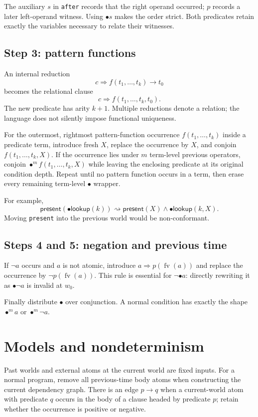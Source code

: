\documentclass[11pt]{article}
\newcommand{\prev}{\mathbin{\bullet}}
\newcommand{\FV}{\operatorname{fv}}
\begin{document}
The auxiliary $s$ in \verb|after| records that the right operand occurred;
$p$ records a later left-operand witness.  Using $\prev s$ makes the order
strict.  Both predicates retain exactly the variables necessary to relate
their witnesses.

\subsection{Step 3: pattern functions}\label{sec:pf}

An internal reduction
\[
c\Rightarrow f(t_1,\ldots,t_k)\to t_0
\]
becomes the relational clause
\[
c\Rightarrow f(t_1,\ldots,t_k,t_0).
\]
The new predicate has arity $k+1$.  Multiple reductions denote a relation;
the language does not silently impose functional uniqueness.

For the outermost, rightmost pattern-function occurrence
$f(t_1,\ldots,t_k)$ inside a predicate term, introduce fresh $X$, replace the
occurrence by $X$, and conjoin $f(t_1,\ldots,t_k,X)$.  If the occurrence lies
under $m$ term-level previous operators, conjoin
$\prev^m f(t_1,\ldots,t_k,X)$ while leaving the enclosing predicate at its
original condition depth.  Repeat until no pattern function occurs in a
term, then erase every remaining term-level $\prev$ wrapper.

For example,
\[
\mathsf{present}(\prev\mathsf{lookup}(k))
\rightsquigarrow
\mathsf{present}(X)\wedge\prev\mathsf{lookup}(k,X).
\]
Moving \verb|present| into the previous world would be non-conformant.

\subsection{Steps 4 and 5: negation and previous time}

If $\neg a$ occurs and $a$ is not atomic, introduce
$a\Rightarrow p(\FV(a))$ and replace the occurrence by
$\neg p(\FV(a))$.  This rule is essential for $\neg\prev a$: directly
rewriting it as $\prev\neg a$ is invalid at $w_0$.

Finally distribute $\prev$ over conjunction.  A normal condition has exactly
the shape $\prev^m a$ or $\prev^m\neg a$.

\section{Models and nondeterminism}\label{sec:model}

Past worlds and external atoms at the current world are fixed inputs.  For a
normal program, remove all previous-time body atoms when constructing the
current dependency graph.  There is an edge $p\to q$ when a current-world
atom with predicate $q$ occurs in the body of a clause headed by predicate
$p$; retain whether the occurrence is positive or negative.
\end{document}
